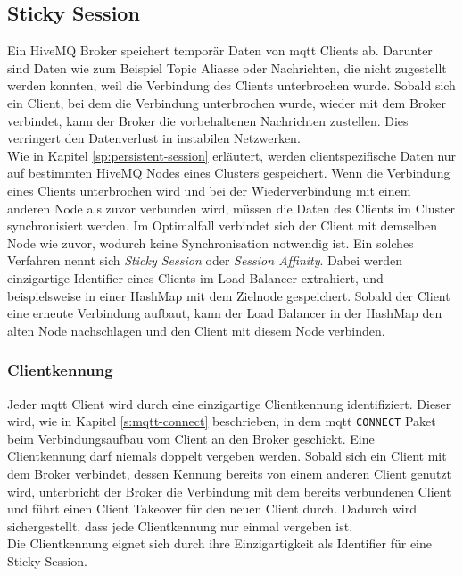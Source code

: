 \subsection{Sticky Session} \label{ss:sticky-session}
Ein HiveMQ Broker speichert temporär Daten von \ac{mqtt} Clients ab. Darunter sind Daten wie zum Beispiel Topic Aliasse oder Nachrichten, die nicht zugestellt werden konnten, weil die Verbindung des Clients unterbrochen wurde. Sobald sich ein Client, bei dem die Verbindung unterbrochen wurde, wieder mit dem Broker verbindet, kann der Broker die vorbehaltenen Nachrichten zustellen.
Dies verringert den Datenverlust in instabilen Netzwerken.
\\
Wie in Kapitel \ref{sp:persistent-session} erläutert, werden clientspezifische Daten nur auf bestimmten HiveMQ Nodes eines Clusters gespeichert.
Wenn die Verbindung eines Clients unterbrochen wird und bei der Wiederverbindung mit einem anderen Node als zuvor verbunden wird, müssen die Daten des Clients im Cluster synchronisiert werden.
Im Optimalfall verbindet sich der Client mit demselben Node wie zuvor, wodurch keine Synchronisation notwendig ist.
Ein solches Verfahren nennt sich \textit{Sticky Session} oder \textit{Session Affinity}. Dabei werden einzigartige Identifier eines Clients im Load Balancer extrahiert, und beispielsweise in einer HashMap mit dem Zielnode gespeichert. Sobald der Client eine erneute Verbindung aufbaut, kann der Load Balancer in der HashMap den alten Node nachschlagen und den Client mit diesem Node verbinden. \cite{WhatDoesTerm}

\subsubsection{Clientkennung} \label{ss:clientid}
Jeder \ac{mqtt} Client wird durch eine einzigartige Clientkennung identifiziert. Dieser wird, wie in Kapitel \ref{s:mqtt-connect} beschrieben, in dem \ac{mqtt} \verb|CONNECT| Paket beim Verbindungsaufbau vom Client an den Broker geschickt.
Eine Clientkennung darf niemals doppelt vergeben werden. Sobald sich ein Client mit dem Broker verbindet, dessen Kennung bereits von einem anderen Client genutzt wird, unterbricht der Broker die Verbindung mit dem bereits verbundenen Client und führt einen Client Takeover für den neuen Client durch. Dadurch wird sichergestellt, dass jede Clientkennung nur einmal vergeben ist.
\\
Die Clientkennung eignet sich durch ihre Einzigartigkeit als Identifier für eine Sticky Session.

